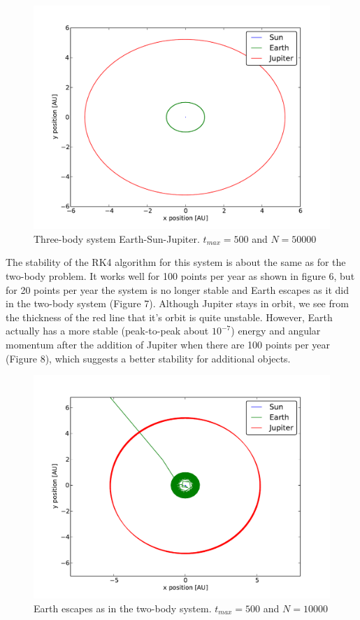 \documentclass[a4paper,12pt, english]{article}
\begin{document}
\begin{figure}[!h]
\centering
\includegraphics[scale = 0.5]{Fig6.pdf}
\caption{Three-body system Earth-Sun-Jupiter. $t_{max} = 500$ and $N = 50000$}
\end{figure} 

The stability of the RK4 algorithm for this system is about the same as for the two-body problem. It works well for 100 points per year as shown in figure 6, but for 20 points per year the system is no longer stable and Earth escapes as it did in the two-body system (Figure 7). Although Jupiter stays in orbit, we see from the thickness of the red line that it's orbit is quite unstable. However, Earth actually has a more stable (peak-to-peak about $10^{-7}$) energy and angular momentum after the addition of Jupiter when there are 100 points per year (Figure 8), which suggests a better stability for additional objects.

\begin{figure}[!h]
\centering
\includegraphics[scale = 0.5]{Fig7.pdf}
\caption{Earth escapes as in the two-body system. $t_{max} = 500$ and $N = 10000$}
\end{figure} 
\end{document}
